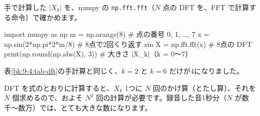 手で計算した $|X_k|$ を、numpy の \texttt{np.fft.fft}（$N$ 点の DFT を、FFT で計算する命令）で確かめます。
\begin{bkcode}[Python]
import numpy as np
m = np.arange(8)                \# 点の番号 0, 1, …, 7
x = np.sin(2*np.pi*2*m/8)       \# 8点で2回くり返す sin
X = np.fft.fft(x)               \# 8点の DFT
print(np.round(np.abs(X), 3))   \# 大きさ |X\_k|（k = 0〜7）
\end{bkcode}
\begin{bkcodeout}[実行結果]
[0. 0. 4. 0. 0. 0. 4. 0.]
\end{bkcodeout}
表\ref{bk:9-4:tab-dft}の手計算と同じく、$k=2$ と $k=6$ だけが4になりました。



\label{bk:9-4:fft}DFT を式のとおりに計算すると、$X_k$ 1つに $N$ 回のかけ算（とたし算）、それを $N$ 個求めるので、およそ $N^2$ 回の計算が必要です。録音した音1秒分（$N$ が数千〜数万）では、とても大きな数になります。

